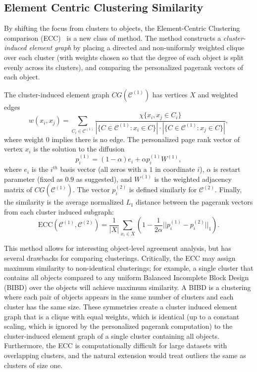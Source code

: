 \documentclass[review,los,12pt]{ryethesis}
\newcommand\cCone{\mathcal{C}^{(1)}}
\newcommand\cCtwo{\mathcal{C}^{(2)}}
\begin{document}
\subsection{Element Centric Clustering Similarity}
By shifting the focus from clusters to objects, the Element-Centric Clustering comparison (ECC)~\cite{ecc} is a new class of method.
The method constructs a \textit{cluster-induced element graph} by placing a directed and non-uniformly weighted clique over each cluster (with weights chosen so that the degree of each object is split evenly across its clusters), and comparing the personalized pagerank vectors of each object.

The cluster-induced element graph $CG(\cCone)$ has vertices $X$ and weighted edges
\begin{equation}
    w(x_i, x_j) = \sum_{C_i \in \cCone} \frac{\chi\{x_i,x_j \in C_i\}}{|\{C \in \cCone : x_i \in C\}| \cdot |\{C \in \cCone : x_j \in C\}|},
\end{equation}
where weight $0$ implies there is no edge.
The personalized page rank vector \cite{pagerank} of vertex $x_i$ is the solution to the diffusion
\begin{equation}
    p^{(1)}_i = (1 - \alpha)e_i + \alpha p^{(1)}_i W^{(1)},
\end{equation}
where $e_i$ is the $i^{th}$ basis vector (all zeros with a $1$ in coordinate $i$), $\alpha$ is restart parameter (fixed as $0.9$ as suggested), and $W^{(1)}$ is the weighted adjacency matrix of $CG(\cCone)$.
The vector $p^{(2)}_i$ is defined similarly for $\cCtwo$.
Finally, the similarity is the average normalized $L_1$ distance between the pagerank vectors from each cluster induced subgraph:
\begin{equation}
    \mathrm{ECC}(\cCone, \cCtwo) = \frac{1}{|X|} \sum_{x_i \in X} \left(1 - \frac{1}{2\alpha}||p^{(1)}_i - p^{(2)}_i||_1 \right).
\end{equation}

This method allows for interesting object-level agreement analysis, but  has several drawbacks for comparing clusterings.
Critically, the ECC may assign maximum similarity to non-identical clusterings; for example, a single cluster that contains all objects compared to any uniform Balanced Incomplete Block Design (BIBD) over the objects will achieve maximum similarity.
A BIBD is a clustering where each pair of objects appears in the same number of clusters and each cluster has the same size.
These symmetries create a cluster induced element graph that is a clique with equal weights, which is identical (up to a constant scaling, which is ignored by the personalized pagerank computation) to the cluster-induced element graph of a single cluster containing all objects.
Furthermore, the ECC is computationally difficult for large datasets with overlapping clusters, and the natural extension would treat outliers the same as clusters of size one.
\end{document}
